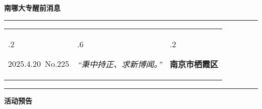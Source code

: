 \documentclass[letterpaper, 12pt]{article}
\begin{document}
\begin{center}
    \Huge\textbf{南哪大专醒前消息}
\end{center}
\vspace{4mm}
\hrule
\renewcommand\tabularxcolumn[1]{m{#1}}
\begin{tabularx}{\textwidth}{>{\hsize.2\hsize}X>{\hsize.6\hsize}X>{\hsize.2\hsize}X}
    \begin{flushleft}
        2025.4.20\, No.225
    \end{flushleft}
    &
    \begin{center}
        \textit{“秉中持正、求新博闻。”}
    \end{center}
    &
    \begin{flushright}
        \textbf{南京市栖霞区}
    \end{flushright}
\end{tabularx}
\vspace{-3.5mm}
\hrule
\vspace{4mm}
\centerline{\huge\textbf{活动预告}}
\end{document}
